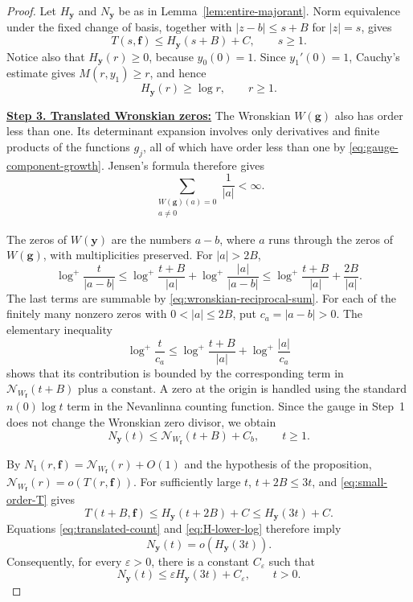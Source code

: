 \documentclass[12pt,letterpaper,reqno]{amsart}
\theoremstyle{definition}
\numberwithin{equation}{section}
\newcommand{\NN}{\mathcal N}
\newcommand{\fv}{\bm f}
\newcommand{\gv}{\bm g}
\newcommand{\yv}{\bm y}
\begin{document}
\begin{proof}
Let \(H_{\yv}\) and \(N_{\yv}\) be as in
Lemma~\ref{lem:entire-majorant}. Norm equivalence under the fixed
change of basis, together with
\(|z-b|\leq s+B\) for \(|z|=s\), gives
\begin{equation}\label{eq:small-order-T}
 T(s,\fv)
 \leq
 H_{\yv}(s+B)+C,
 \qquad
 s\geq1.
\end{equation}
Notice also that \(H_{\yv}(r)\geq0\), because \(y_0(0)=1\). Since
\(y_1'(0)=1\), Cauchy's estimate gives \(M(r,y_1)\geq r\), and hence
\begin{equation}\label{eq:H-lower-log}
 H_{\yv}(r)\geq\log r,
 \qquad
 r\geq1.
\end{equation}


\medskip\noindent
\textbf{\underline{Step 3. Translated Wronskian zeros:}}
The Wronskian \(W(\gv)\) also has order less than one. Its determinant
expansion involves only derivatives and finite products of the functions
\(g_j\), all of which have order less than one by
\eqref{eq:gauge-component-growth}. Jensen's formula therefore gives
\begin{equation}\label{eq:wronskian-reciprocal-sum}
 \sum_{\substack{W(\gv)(a)=0\\ a\ne0}}
 \frac1{|a|}
 <\infty.
\end{equation}

The zeros of \(W(\yv)\) are the numbers \(a-b\), where \(a\) runs
through the zeros of \(W(\gv)\), with multiplicities preserved.
For \(|a|>2B\),
\[
 \log^+\frac{t}{|a-b|}
 \leq
 \log^+\frac{t+B}{|a|}
 +
 \log^+\frac{|a|}{|a-b|}
 \leq
 \log^+\frac{t+B}{|a|}+\frac{2B}{|a|}.
\]
The last terms are summable by
\eqref{eq:wronskian-reciprocal-sum}. For each of the finitely many nonzero zeros with
\(0<|a|\leq2B\), put \(c_a=|a-b|>0\). The elementary inequality
\[
 \log^+\frac{t}{c_a}
 \leq
 \log^+\frac{t+B}{|a|}
 +\log^+\frac{|a|}{c_a}
\]
shows that its contribution is bounded by the corresponding term in
\(\NN_{W_{\fv}}(t+B)\) plus a constant. A zero at the origin is
handled using the standard \(n(0)\log t\) term in the Nevanlinna
counting function. Since the gauge in Step~1
does not change the Wronskian zero divisor, we obtain
\begin{equation}\label{eq:translated-count}
 N_{\yv}(t)
 \leq
 \NN_{W_{\fv}}(t+B)+C_b,
 \qquad
 t\geq1.
\end{equation}

By \(N_1(r,\fv)=\NN_{W_{\fv}}(r)+O(1)\) and the hypothesis of the
proposition,
\(\NN_{W_{\fv}}(r)=o(T(r,\fv))\). For sufficiently large \(t\),
\(t+2B\leq3t\), and \eqref{eq:small-order-T} gives
\[
 T(t+B,\fv)
 \leq
 H_{\yv}(t+2B)+C
 \leq
 H_{\yv}(3t)+C.
\]
Equations \eqref{eq:translated-count} and \eqref{eq:H-lower-log}
therefore imply
\[
 N_{\yv}(t)
 =
 o(H_{\yv}(3t)).
\]
Consequently, for every \(\varepsilon>0\), there is a constant
\(C_\varepsilon\) such that
\begin{equation}\label{eq:small-order-divisor-majorant}
 N_{\yv}(t)
 \leq
 \varepsilon H_{\yv}(3t)+C_\varepsilon,
 \qquad
 t>0.
\end{equation}



\end{proof}
\end{document}
